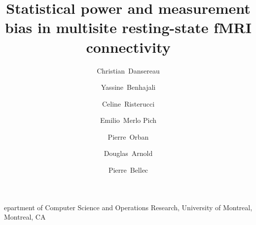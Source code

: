 \documentclass[authoryear]{elsarticle}
\begin{document}
\begin{frontmatter}
\title{Statistical power and measurement bias in multisite resting-state fMRI connectivity}

\author[a,b]{Christian~Dansereau}
\author[a,c]{Yassine~Benhajali}
\author[d]{Celine~Risterucci}
\author[d]{Emilio~Merlo Pich}
\author[a]{Pierre~Orban}
\author[e]{Douglas~Arnold}
\author[a,b]{Pierre~Bellec}
\address[a]{Centre de Recherche de l'Institut Universitaire de G\'eriatrie de Montr\'eal, Montr\'eal, CA}
\address[b]Department of Computer Science and Operations Research, University of Montreal, Montreal, CA
\address[c]{D\'epartement d'anthropologie, Universit\' de Montr\'eal, Montr\'eal, CA}
\address[d]{Clinical Imaging, pRED, F.Hoffman-La Roche, Basel, CH}
\address[e]{NeuroRx inc., Montr\'eal, CA}


%


\end{frontmatter}
\end{document}
